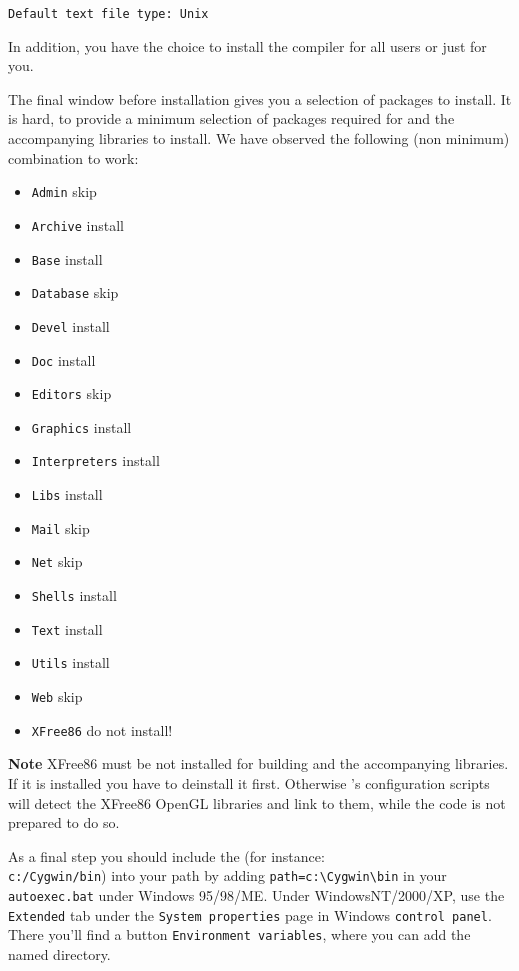  \texttt{Default text file type: Unix}

\noindent
 In addition, you have the choice to install the compiler for all users or just for you.
 
  The final window before installation gives you a selection of packages to install. It is hard, to provide a minimum selection of packages required for \FlightGear{} and the accompanying libraries to install. We have observed the following (non minimum) combination to work:
  
  \begin{itemize}
  \item{\texttt{Admin}} skip
  \item{\texttt{Archive}} install
  \item{\texttt{Base}} install
  \item{\texttt{Database}} skip
  \item{\texttt{Devel}} install
  \item{\texttt{Doc}} install
  \item{\texttt{Editors}} skip
  \item{\texttt{Graphics}} install
  \item{\texttt{Interpreters}} install
  \item{\texttt{Libs}} install
  \item{\texttt{Mail}} skip
  \item{\texttt{Net}} skip
  \item{\texttt{Shells}} install
  \item{\texttt{Text}} install
  \item{\texttt{Utils}} install
  \item{\texttt{Web}} skip
  \item{\texttt{XFree86}} do not install!
  \end{itemize}

\textbf{Note} XFree86 must be not installed for building \FlightGear{} and the accompanying libraries. If it is installed you have to deinstall it first. Otherwise \FlightGear{}'s configuration scripts will detect the XFree86 OpenGL libraries and link to them, while the code is not prepared to do so.

As a final step you should include the  (for instance:\\
\texttt{c:/Cygwin/bin}) into your path by adding \verb/path=c:\Cygwin\bin/ in
your \texttt{autoexec.bat} under Windows 95/98/ME. Under WindowsNT/2000/XP, use the \texttt{Extended} tab under the \texttt{System properties} page in Windows \texttt{control panel}. There you'll find a button \texttt{Environment variables}, where you can add the named directory.

